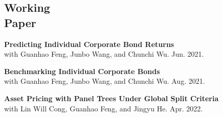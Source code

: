\documentclass[margin]{res}
\begin{document}
\begin{resume}
\vspace{5mm}

\section{\sc Working \\ Paper}

\textbf{Predicting Individual Corporate Bond Returns \\}
with Guanhao Feng, Junbo Wang, and Chunchi Wu. Jun. 2021.

\textbf{Benchmarking Individual Corporate Bonds \\}
with Guanhao Feng, Junbo Wang, and Chunchi Wu.  Aug. 2021.

\textbf{Asset Pricing with Panel Trees Under Global Split Criteria \\}
with Lin Will Cong, Guanhao Feng, and Jingyu He. Apr. 2022. 

\vspace{5mm}








\end{resume}
\end{document}
